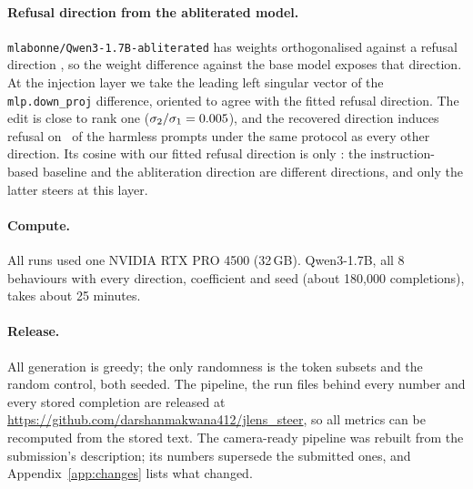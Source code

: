 \documentclass{article}
\begin{document}
\paragraph{Refusal direction from the abliterated model.}
\texttt{mlabonne/Qwen3-1.7B-abliterated} has weights orthogonalised against a refusal direction \citep{arditi2024refusal}, so the weight difference against the base model exposes that direction. At the injection layer we take the leading left singular vector of the \texttt{mlp.down\_proj} difference, oriented to agree with the fitted refusal direction. The edit is close to rank one ($\sigma_2/\sigma_1 = 0.005$), and the recovered direction induces refusal on \ABLRATE\ of the harmless prompts under the same protocol as every other direction. Its cosine with our fitted refusal direction is only \ABLCOS: the instruction-based baseline and the abliteration direction are different directions, and only the latter steers at this layer.

\paragraph{Compute.}
All runs used one NVIDIA RTX PRO 4500 (32\,GB). Qwen3-1.7B, all 8 behaviours with every direction, coefficient and seed (about 180{,}000 completions), takes about 25 minutes.

\paragraph{Release.}
All generation is greedy; the only randomness is the token subsets and the random control, both seeded. The pipeline, the run files behind every number and every stored completion are released at \url{https://github.com/darshanmakwana412/jlens_steer}, so all metrics can be recomputed from the stored text. The camera-ready pipeline was rebuilt from the submission's description; its numbers supersede the submitted ones, and Appendix~\ref{app:changes} lists what changed.
\end{document}
